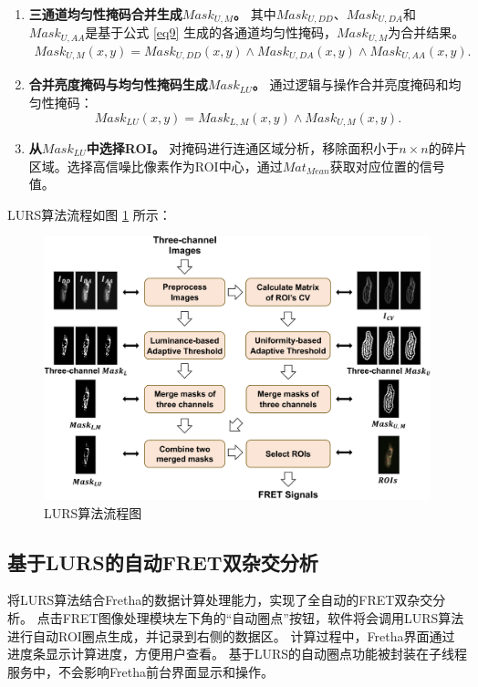 \begin{enumerate}
\item \textbf{三通道均匀性掩码合并生成${Mask}_{U,M}$。}  
其中${Mask}_{U,DD}$、${Mask}_{U,DA}$和${Mask}_{U,AA}$是基于公式 \ref{eq9} 生成的各通道均匀性掩码，${Mask}_{U,M}$为合并结果。
\begin{equation}
    \begin{split}
    {Mask}_{U,M}(x,y)={Mask}_{U,DD}(x,y) \land {Mask}_{U,DA}(x,y) \land {Mask}_{U,AA}(x,y) .
    \end{split}
    \label{eq_merge_u}
\end{equation}
\item \textbf{合并亮度掩码与均匀性掩码生成${Mask}_{LU}$。}  
通过逻辑与操作合并亮度掩码和均匀性掩码：
\begin{equation}
    {Mask}_{LU}(x,y)={Mask}_{L,M}(x,y) \land {Mask}_{U,M}(x,y) .
    \label{eq10}
\end{equation}
\item \textbf{从${Mask}_{LU}$中选择ROI。}  
对掩码进行连通区域分析，移除面积小于$n \times n$的碎片区域。选择高信噪比像素作为ROI中心，通过${Mat}_{Mean}$获取对应位置的信号值。
\end{enumerate}

LURS算法流程如图 \ref{fig1} 所示：
\begin{figure}[!htbp]
\centering
\includegraphics[width=1\linewidth]{../figures/4/LURS流程图.drawio.png}
\caption{LURS算法流程图}\label{fig1}
\end{figure}

\subsection{基于LURS的自动FRET双杂交分析}
将LURS算法结合Fretha的数据计算处理能力，实现了全自动的FRET双杂交分析。
点击FRET图像处理模块左下角的“自动圈点”按钮，软件将会调用LURS算法进行自动ROI圈点生成，并记录到右侧的数据区。
计算过程中，Fretha界面通过进度条显示计算进度，方便用户查看。
基于LURS的自动圈点功能被封装在子线程服务中，不会影响Fretha前台界面显示和操作。

